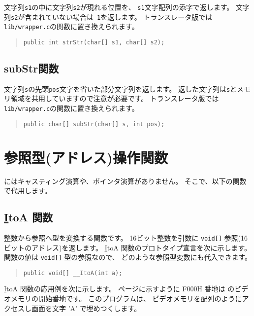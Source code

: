文字列\verb/s1/の中に文字列\verb/s2/が現れる位置を、
\verb/s1/文字配列の添字で返します。
文字列\verb/s2/が含まれていない場合は\verb/-1/を返します。
トランスレータ版では\verb;lib/wrapper.c;の関数に置き換えられます。

\begin{quote}
\begin{verbatim}
public int strStr(char[] s1, char[] s2);
\end{verbatim}
\end{quote}

\subsection{subStr関数}

文字列\verb/s/の先頭\verb/pos/文字を省いた部分文字列を返します。
返した文字列は\verb/s/とメモリ領域を共用していますので注意が必要です。
トランスレータ版では\verb;lib/wrapper.c;の関数に置き換えられます。

\begin{quote}
\begin{verbatim}
public char[] subStr(char[] s, int pos);
\end{verbatim}
\end{quote}

\section{参照型(アドレス)操作関数}

\cmml にはキャスティング演算や、ポインタ演算がありません。
そこで、以下の関数で代用します。

\subsection{\ul \ul ItoA 関数}
\label{chap4:itoa}

整数から参照へ型を変換する関数です。
16ビット整数を引数に \verb/void[]/ 参照(16ビットのアドレス)を返します。
\ul \ul ItoA 関数のプロトタイプ宣言を次に示します。
関数の値は \verb/void[]/ 型の参照なので、
どのような参照型変数にも代入できます。

\begin{quote}
\begin{verbatim}
public void[] __ItoA(int a);
\end{verbatim}
\end{quote}

\ul \ul ItoA 関数の応用例を次に示します。
\pageref{app:memmap}ページに示すように
F000H 番地は \tac のビデオメモリの開始番地です。
このプログラムは、
ビデオメモリを配列のようにアクセスし画面を文字 'A' で埋めつくします。

